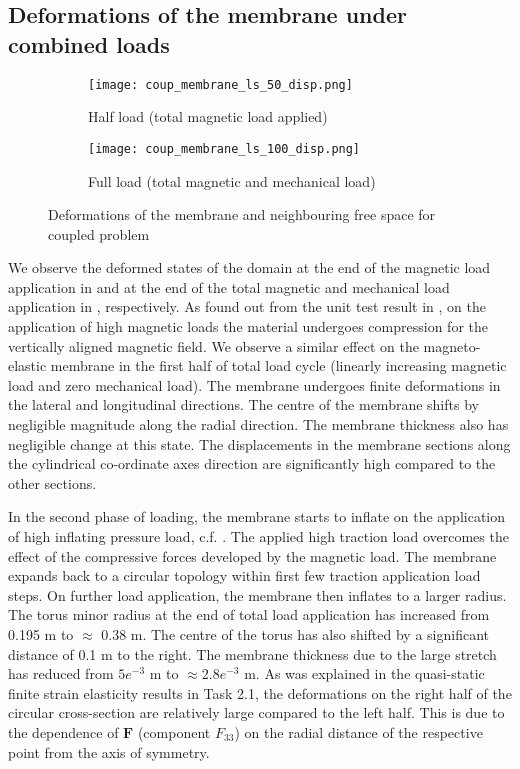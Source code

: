 \subsection{Deformations of the membrane under combined loads}

\begin{figure}[h]
\centering
\begin{subfigure}{0.48\textwidth}
\centering
\texttt{[image: coup\_membrane\_ls\_50\_disp.png]}
\caption{Half load (total magnetic load applied)}
\label{fig:3.11.1}
\end{subfigure}
\begin{subfigure}{0.48\textwidth}
\centering
\texttt{[image: coup\_membrane\_ls\_100\_disp.png]}
\caption{Full load (total magnetic and mechanical load)}
\label{fig:3.11.2}
\end{subfigure}
\caption{Deformations of the membrane and neighbouring free space for coupled problem}
\label{fig:3.11}
\end{figure}

We observe the deformed states of the domain at the end of the magnetic load application  in  and at the end of the total magnetic and mechanical load application in , respectively. As found out from the unit test result in , on the application of high magnetic loads the material undergoes compression for the vertically aligned magnetic field. We observe a similar effect on the magneto-elastic membrane in the first half of total load cycle (linearly increasing magnetic load and zero mechanical load). The membrane undergoes finite deformations in the lateral and longitudinal directions. The centre of the membrane shifts by negligible magnitude along the radial direction. The membrane thickness also has negligible change at this state. The displacements in the membrane sections along the cylindrical co-ordinate axes direction are significantly high compared to the other sections. \par 
In the second phase of loading, the membrane starts to inflate on the application of high inflating pressure load, c.f. . The applied high traction load overcomes the effect of the compressive forces developed by the magnetic load. The membrane expands back to a circular topology within first few traction application load steps. On further load application, the membrane then inflates to a larger radius. The torus minor radius at the end of total load application has increased from 0.195 m to $\approx$ 0.38 m. The centre of the torus has also shifted by a significant distance of 0.1 m to the right. The membrane thickness due to the large stretch has reduced from $5e^{-3}$ m to $\approx 2.8e^{-3}$ m. As was explained in the quasi-static finite strain elasticity results in Task 2.1, the deformations on the right half of the circular cross-section are relatively large compared to the left half. This is due to the dependence of $\mathbf{F}$ (component $F_{33}$) on the radial distance of the respective point from the axis of symmetry. \par 

